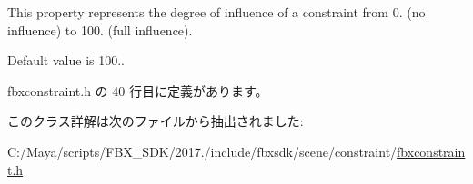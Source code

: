 This property represents the degree of influence of a constraint from 0. (no influence) to 100. (full influence).

Default value is 100.. 

 fbxconstraint.\+h の 40 行目に定義があります。



このクラス詳解は次のファイルから抽出されました\+:\begin{DoxyCompactItemize}
\item 
C\+:/\+Maya/scripts/\+F\+B\+X\+\_\+\+S\+D\+K/2017./include/fbxsdk/scene/constraint/\hyperlink{fbxconstraint_8h}{fbxconstraint.\+h}\end{DoxyCompactItemize}
